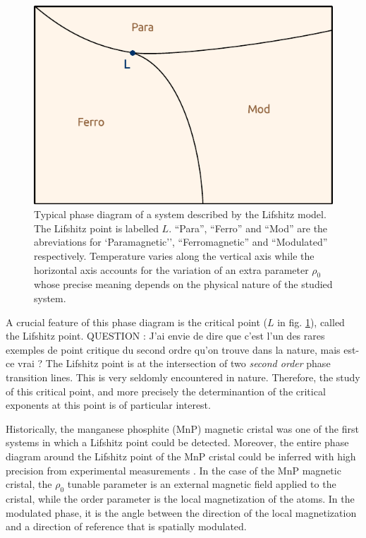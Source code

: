 \begin{figure}[htp]
\begin{center}
\includegraphics[scale=1]{img/chap1/phase_diagram_2.pdf}
\caption{Typical phase diagram of a system described by the Lifshitz model. The Lifshitz point is labelled $L$. ``Para'', ``Ferro'' and ``Mod'' are the abreviations for `Paramagnetic'', ``Ferromagnetic'' and ``Modulated'' respectively. Temperature varies along the vertical axis while the horizontal axis accounts for the variation of an extra parameter $\rho_0$ whose precise meaning depends on the physical nature of the studied system.}
\label{fig:phase_diagram}
\end{center}
\end{figure}

A crucial feature of this phase diagram is the critical point ($L$ in fig. \ref{fig:phase_diagram}), called the Lifshitz point. 
QUESTION : J'ai envie de dire que c'est l'un des rares exemples de point critique du second ordre qu'on trouve dans la nature, mais est-ce vrai ?
The Lifshitz point is at the intersection of two \textit{second order} phase transition lines. This is very seldomly encountered in nature. Therefore, the study of this critical point, and more precisely the determinantion of the critical exponents at this point is of particular interest.

Historically, the manganese phosphite (MnP) magnetic cristal was one of the first systems in which a Lifshitz point could be detected. Moreover, the entire phase diagram around the Lifshitz point of the MnP cristal could be inferred with high precision from experimental measurements \cite{MnP}.
In the case of the MnP magnetic cristal, the $\rho_0$ tunable parameter is an external magnetic field applied to the cristal, while the order parameter  is the local magnetization of the atoms. In the modulated phase, it is the angle between the direction of the local magnetization and a direction of reference that is spatially modulated.

